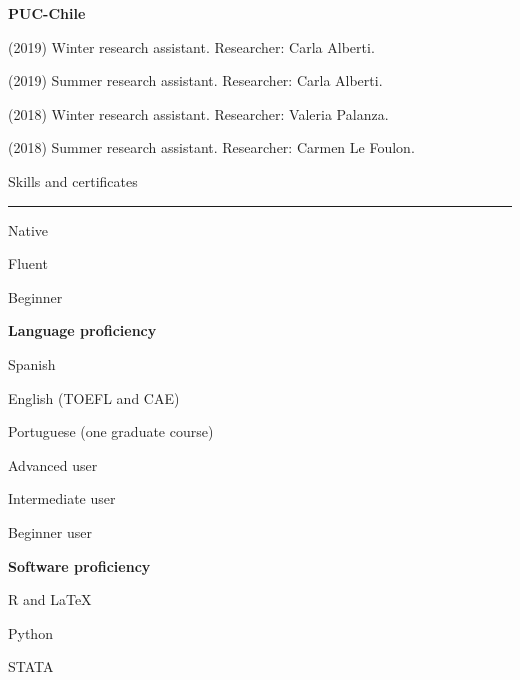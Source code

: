 \documentclass[a4paper, 12pt]{article}
\begin{document}
\begin{multicols}{2}

\textbf{PUC-Chile}

\columnbreak

\begin{flushright}

(2019) Winter research assistant. Researcher: Carla Alberti.

(2019) Summer research assistant. Researcher: Carla Alberti.

(2018) Winter research assistant. Researcher: Valeria Palanza.

(2018) Summer research assistant. Researcher: Carmen Le Foulon.

\end{flushright}

\end{multicols}





\large Skills and certificates

\smallskip

\hrule

\normalsize

\begin{multicols}{2}

\hfill

Native

Fluent

Beginner

\columnbreak

\begin{flushright}

\textbf{Language proficiency}

\medskip

Spanish

English (TOEFL and CAE)

Portuguese (one graduate course)

\end{flushright}

\end{multicols}

\begin{multicols}{2}

\hfill

Advanced user

Intermediate user

Beginner user

\columnbreak

\begin{flushright}

\textbf{Software proficiency}

\medskip

\textsf{R} and \LaTeX

\textsf{Python}

\textsf{STATA}

\end{flushright}

\end{multicols}
\end{document}
